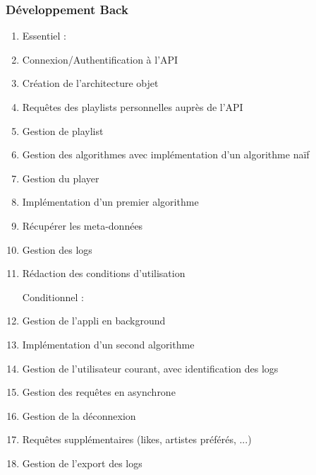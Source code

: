 \documentclass{article}
\begin{document}
		\subsubsection{Développement Back}
		\begin{enumerate}[resume]
			\item[]
			      \begin{description}
			      	\item[Essentiel :]
			      \end{description}
			\item Connexion/Authentification à l'API\label{connexion_item}
			\item Création de l'architecture objet\label{arch_item}
			\item Requêtes des playlists personnelles auprès de l'API\label{playlist_requete_item}
			\item Gestion de playlist\label{playlist_gestion_item}
			\item Gestion des algorithmes avec implémentation d'un algorithme naïf\label{algo_gestion_item}
			\item Gestion du player\label{player_gestion_item}
			\item Implémentation d'un premier algorithme\label{premier_algo_item}
			\item Récupérer les meta-données\label{data_item}
			\item Gestion des logs\label{log_gestion_item}
			\item Rédaction des conditions d'utilisation\label{condition_util_item}
			      			      			                  
			      \begin{description}
			      	\item[Conditionnel :]
			      \end{description}            
			\item Gestion de l'appli en background\label{background_item}
			\item Implémentation d'un second algorithme\label{second_algo_item}
			\item Gestion de l'utilisateur courant, avec identification des logs\label{utilisateur_courant_log_item}
			\item Gestion des requêtes en asynchrone\label{requete_async_item}
			\item Gestion de la déconnexion\label{deconnexion_item}
			\item Requêtes supplémentaires (likes, artistes préférés, ...)\label{requete_sup_item}
			\item Gestion de l'export des logs\label{export_log_item}
			      			      			                  

\end{enumerate}
\end{document}
